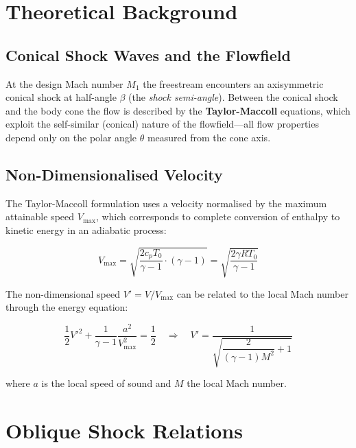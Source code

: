 \documentclass[12pt,a4paper]{article}
\begin{document}
\section{Theoretical Background}
\label{sec:theory}

\subsection{Conical Shock Waves and the Flowfield}

At the design Mach number $M_1$ the freestream encounters an axisymmetric
conical shock at half-angle $\beta$ (the \emph{shock semi-angle}).  Between the
conical shock and the body cone the flow is described by the
\textbf{Taylor-Maccoll} equations, which exploit the self-similar (conical)
nature of the flowfield---all flow properties depend only on the polar angle
$\theta$ measured from the cone axis.

\subsection{Non-Dimensionalised Velocity}
\label{sec:Vprime}

The Taylor-Maccoll formulation uses a velocity normalised by the maximum
attainable speed $V_{\max}$, which corresponds to complete conversion of
enthalpy to kinetic energy in an adiabatic process:

\begin{equation}
    V_{\max} = \sqrt{\frac{2 c_p T_0}{\gamma - 1} \cdot (\gamma - 1)}
             = \sqrt{\frac{2 \gamma R T_0}{\gamma - 1}}
    \label{eq:Vmax}
\end{equation}

The non-dimensional speed $V' = V / V_{\max}$ can be related to the local Mach
number through the energy equation:

\begin{equation}
    \frac{1}{2} V'^2 + \frac{1}{\gamma - 1}\frac{a^2}{V_{\max}^2} = \frac{1}{2}
    \quad\Longrightarrow\quad
    V' = \frac{1}{\displaystyle\sqrt{\dfrac{2}{(\gamma-1)M^2}+1}}
    \label{eq:Vprime}
\end{equation}

where $a$ is the local speed of sound and $M$ the local Mach number.

\section{Oblique Shock Relations}
\label{sec:oblique}
\end{document}
